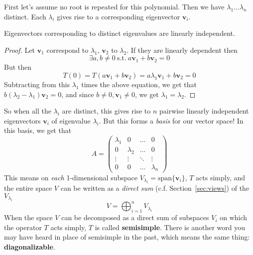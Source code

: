 	First let's assume no root is repeated for this polynomial. Then we have $\lambda_1 \dots \lambda_n$ distinct. Each $\lambda_i$ gives rise to a corresponding eigenvector $\mathbf v_i$.
	\begin{lemma}\label{lemma:distinct_eigenval_spaces_indep}
		Eigenvectors corresponding to distinct eigenvalues are linearly independent. 
	\end{lemma}
	\begin{proof}
		Let $\mathbf v_1$ correspond to $\lambda_1$, $\mathbf v_2$ to $\lambda_2$. If they are linearly dependent then
		\begin{equation}
			\exists a,b \ne 0 ~ \mathrm{s.t.} ~ a \mathbf v_1 + b \mathbf v_2 = 0
		\end{equation}
		But then
		\begin{equation}
			T(0) = T(a \mathbf v_1 + b \mathbf v_2) = a \lambda_1 \mathbf v_1 + b \mathbf v_2 = 0
		\end{equation}
		Subtracting from this $\lambda_1$ times the above equation, we get that $b (\lambda_2 - \lambda_1) \mathbf v_2 = 0$, and since $b \ne 0, \mathbf v_1 \ne 0$, we get $\lambda_1 = \lambda_2$.
	\end{proof}
	So when all the $\lambda_i$ are distinct, this gives rise to $n$ pairwise linearly independent eigenvectors $\mathbf v_i$ of eigenvalue $\lambda_i$. But this forms a \emph{basis} for our vector space! In this basis, we get that 
	\begin{equation}\label{eq:distinct_root_semisimple}
		A = \begin{pmatrix}
			\lambda_1 & 0 & \dots & 0\\
			0 & \lambda_2 &\dots & 0\\
			\vdots & \vdots & \ddots & \vdots\\
			0 & 0 & \dots & \lambda_n
		\end{pmatrix}
	\end{equation}
	This means on \emph{each} 1-dimensional subspace $V_{\lambda_i} = \text{span}\{\mathbf v_i\}$, $T$ acts simply, and the entire space $V$ can be written as a \emph{direct sum} (c.f. Section~\ref{sec:views}) of the $V_{\lambda_i}$
	\begin{equation}
		V = \bigoplus_{i=1}^n V_{\lambda_i}
	\end{equation}
	When the space $V$ can be decomposed as a direct sum of subspaces $V_i$ on which the operator $T$ acts simply, $T$ is called \textbf{semisimple}. There is another word you may have heard in place of semisimple in the past, which means the same thing: \textbf{diagonalizable}. 
